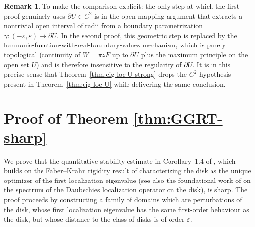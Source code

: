 \documentclass[a4paper,11pt,reqno]{amsart}
\numberwithin{equation}{section}
\theoremstyle{plain} %
\theoremstyle{definition} %
\newtheorem{remark}{Remark}[section]
\theoremstyle{remark}
\begin{document}
\begin{remark}
To make the comparison explicit: the only step at which the first proof
genuinely uses \(\partial U\in C^2\) is in the open-mapping argument that
extracts a nontrivial open interval of radii from a boundary parametrization
\(\gamma:(-\varepsilon,\varepsilon)\to\partial U\). In the second proof, this
geometric step is replaced by the harmonic-function-with-real-boundary-values
mechanism, which is purely topological (continuity of \(W=\pi zF\) up to
\(\partial U\) plus the maximum principle on the open set \(U\)) and is
therefore insensitive to the regularity of \(\partial U\). It is in this
precise sense that Theorem~\ref{thm:eig-loc-U-strong} drops the \(C^2\)
hypothesis present in Theorem~\ref{thm:eig-loc-U} while delivering the same
conclusion.
\end{remark}


\section{Proof of Theorem \ref{thm:GGRT-sharp}}\label{sec:GGRT-sharp}

We prove that the quantitative stability estimate in Corollary~1.4 of
\cite{Gomez-Guerra-Ramos-Tilli}, which builds on the Faber--Krahn rigidity
result of \cite{Nicola-Tilli} characterizing the disk as the unique optimizer
of the first localization eigenvalue (see also the foundational work of
\cite{Daubechies} on the spectrum of the Daubechies localization operator on
the disk), is sharp. The proof proceeds by constructing a family of domains
which are perturbations of the disk, whose first localization eigenvalue has
the same first-order behaviour as the disk, but whose distance to the class of
disks is of order $\varepsilon$.
\end{document}
